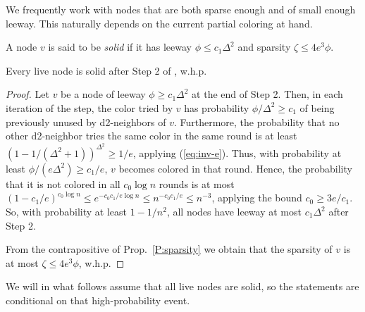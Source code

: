We frequently work with nodes that are both sparse enough and of small enough leeway. This naturally depends on the current partial coloring at hand.
\begin{definition}
A node $v$ is said to be \emph{solid} if it has leeway $\phi \le c_1 \Delta^2$ and sparsity $\zeta \le 4 e^3 \phi$. 
\label{D:solid}
\end{definition}


\begin{observation}
Every live node is solid after Step 2 of , w.h.p.
\label{O:sparse}
\end{observation}

\begin{proof}
Let $v$ be a node of leeway $\phi \ge c_1 \Delta^2$ at the end of Step 2.
Then, in each iteration of the step, the color tried by $v$ has probability $\phi/\Delta^2 \ge c_1$ of being previously unused by d2-neighbors of $v$. Furthermore, the probability that no other d2-neighbor tries the same color in the same round is at least $(1-1/(\Delta^2+1))^{\Delta^2} \ge 1/e$, applying (\ref{eq:inv-e}). Thus,
with probability at least $\phi/(e \Delta^2) \ge c_1/e$, $v$ becomes colored in that round. Hence, the probability that it is not colored in all $c_0 \log n$ rounds is at most $(1-c_1/e)^{c_0\log n} \le e^{-c_0 c_1/e \log n} \le n^{-c_0 c_1/e} \le n^{-3}$, applying the bound $c_0 \ge 3e/c_1$.
So, with probability at least $1-1/n^2$, all nodes have leeway at most $c_1 \Delta^2$ after Step 2.

From the contrapositive of Prop.~\ref{P:sparsity} we obtain that the sparsity of $v$ is at most $\zeta \le 4e^3 \phi$, w.h.p.
\end{proof}

We will in what follows assume that all live nodes are solid, so the statements are conditional on that high-probability event.

